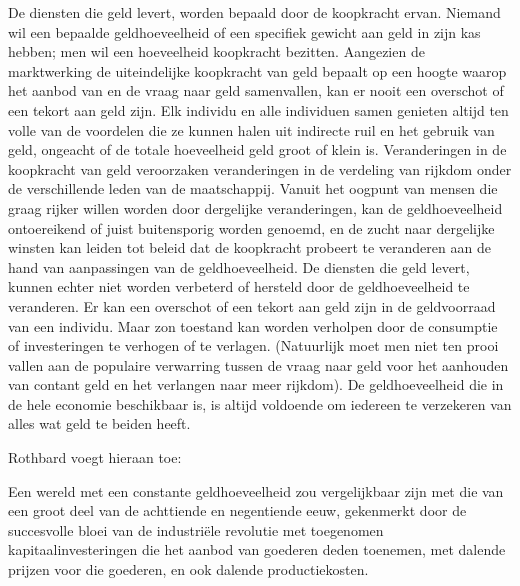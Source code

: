 \begin{blockquotebox}
    De diensten die geld levert, worden bepaald door de koopkracht ervan. Niemand wil een bepaalde geldhoeveelheid of een specifiek gewicht aan geld in zijn kas hebben; men wil een hoeveelheid koopkracht bezitten. Aangezien de marktwerking de uiteindelijke koopkracht van geld bepaalt op een hoogte waarop het aanbod van en de vraag naar geld samenvallen, kan er nooit een overschot of een tekort aan geld zijn. Elk individu en alle individuen samen genieten altijd ten volle van de voordelen die ze kunnen halen uit indirecte ruil en het gebruik van geld, ongeacht of de totale hoeveelheid geld groot of klein is. Veranderingen in de koopkracht van geld veroorzaken veranderingen in de verdeling van rijkdom onder de verschillende leden van de maatschappij. Vanuit het oogpunt van mensen die graag rijker willen worden door dergelijke veranderingen, kan de geldhoeveelheid ontoereikend of juist buitensporig worden genoemd, en de zucht naar dergelijke winsten kan leiden tot beleid dat de koopkracht probeert te veranderen aan de hand van aanpassingen van de geldhoeveelheid. De diensten die geld levert, kunnen echter niet worden verbeterd of hersteld door de geldhoeveelheid te veranderen. Er kan een overschot of een tekort aan geld zijn in de geldvoorraad van een individu. Maar zo\textquotesingle n toestand kan worden verholpen door de consumptie of investeringen te verhogen of te verlagen. (Natuurlijk moet men niet ten prooi vallen aan de populaire verwarring tussen de vraag naar geld voor het aanhouden van contant geld en het verlangen naar meer rijkdom). De geldhoeveelheid die in de hele economie beschikbaar is, is altijd voldoende om iedereen te verzekeren van alles wat geld te beiden heeft.\footnotemark
\end{blockquotebox}

Rothbard voegt hieraan toe:

\begin{blockquotebox}
    Een wereld met een constante geldhoeveelheid zou vergelijkbaar zijn met die van een groot deel van de achttiende en negentiende eeuw, gekenmerkt door de succesvolle bloei van de industriële revolutie met toegenomen kapitaalinvesteringen die het aanbod van goederen deden toenemen, met dalende prijzen voor die goederen, en ook dalende productiekosten.\footnotemark
\end{blockquotebox}



